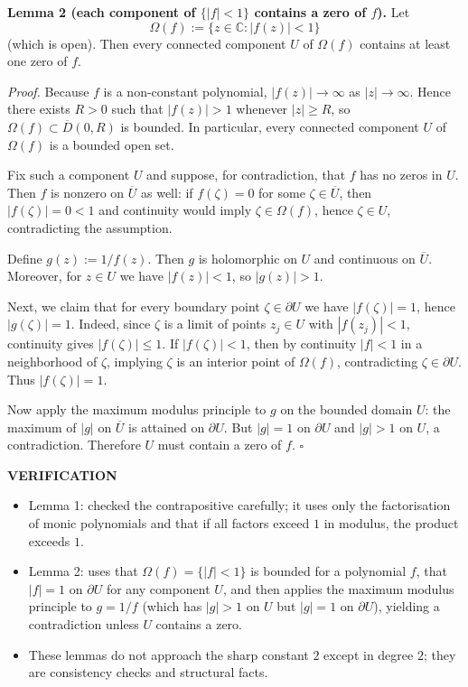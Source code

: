 \medskip
\noindent\textbf{Lemma 2 (each component of $\{|f|<1\}$ contains a zero of $f$).}
Let
\[
\Omega(f):=\{z\in\mathbb{C}: |f(z)|<1\}
\]
(which is open). Then every connected component $U$ of $\Omega(f)$ contains at least one zero of $f$.

\textit{Proof.}
Because $f$ is a non-constant polynomial, $|f(z)|\to\infty$ as $|z|\to\infty$. Hence there exists $R>0$ such that $|f(z)|>1$ whenever $|z|\ge R$, so $\Omega(f)\subset \overline{D}(0,R)$ is bounded. In particular, every connected component $U$ of $\Omega(f)$ is a bounded open set.

Fix such a component $U$ and suppose, for contradiction, that $f$ has no zeros in $U$. Then $f$ is nonzero on $\overline{U}$ as well: if $f(\zeta)=0$ for some $\zeta\in\overline{U}$, then $|f(\zeta)|=0<1$ and continuity would imply $\zeta\in\Omega(f)$, hence $\zeta\in U$, contradicting the assumption.

Define $g(z):=1/f(z)$. Then $g$ is holomorphic on $U$ and continuous on $\overline{U}$. Moreover, for $z\in U$ we have $|f(z)|<1$, so $|g(z)|>1$.

Next, we claim that for every boundary point $\zeta\in\partial U$ we have $|f(\zeta)|=1$, hence $|g(\zeta)|=1$. Indeed, since $\zeta$ is a limit of points $z_j\in U$ with $|f(z_j)|<1$, continuity gives $|f(\zeta)|\le 1$. If $|f(\zeta)|<1$, then by continuity $|f|<1$ in a neighborhood of $\zeta$, implying $\zeta$ is an interior point of $\Omega(f)$, contradicting $\zeta\in\partial U$. Thus $|f(\zeta)|=1$.

Now apply the maximum modulus principle to $g$ on the bounded domain $U$: the maximum of $|g|$ on $\overline{U}$ is attained on $\partial U$. But $|g|=1$ on $\partial U$ and $|g|>1$ on $U$, a contradiction. Therefore $U$ must contain a zero of $f$.
\hfill$\square$

\medskip
\noindent\textbf{VERIFICATION}

\begin{itemize}
\item Lemma 1: checked the contrapositive carefully; it uses only the factorisation of monic polynomials and that if all factors exceed $1$ in modulus, the product exceeds $1$.
\item Lemma 2: uses that $\Omega(f)=\{|f|<1\}$ is bounded for a polynomial $f$, that $|f|=1$ on $\partial U$ for any component $U$, and then applies the maximum modulus principle to $g=1/f$ (which has $|g|>1$ on $U$ but $|g|=1$ on $\partial U$), yielding a contradiction unless $U$ contains a zero.
\item These lemmas do not approach the sharp constant $2$ except in degree $2$; they are consistency checks and structural facts.
\end{itemize}

